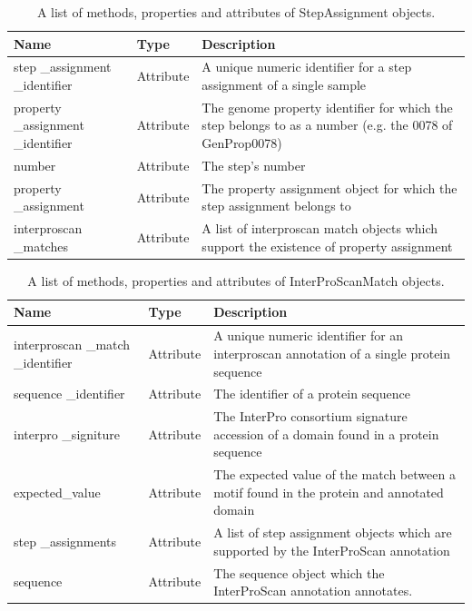 \begin{table}[!ht]
\centering
\caption{A list of methods, properties and attributes of StepAssignment objects.}
\label{tab:stepassignmentobject}
\begin{tabular}{|p{2.7cm}|p{2cm}|p{10cm}|}
\hline
\textbf{Name} & \textbf{Type} & \textbf{Description} \\ \hline
step \_assignment \_identifier & Attribute & A unique numeric identifier for a step assignment of a single sample \\ \hline
property \_assignment \_identifier & Attribute & The genome property identifier for which the step belongs to as a number (e.g. the 0078 of GenProp0078) \\ \hline
number & Attribute & The step's number \\ \hline
property \_assignment & Attribute & The property assignment object for which the step assignment belongs to \\ \hline
interproscan \_matches & Attribute & A list of interproscan match objects which support the existence of property assignment \\ \hline
\end{tabular}
\end{table}

\begin{table}[!ht]
\centering
\caption{A list of methods, properties and attributes of InterProScanMatch objects.}
\label{tab:interproscanannotationobject}
\begin{tabular}{|p{2.7cm}|p{2cm}|p{10cm}|}
\hline
\textbf{Name} & \textbf{Type} & \textbf{Description} \\ \hline
interproscan \_match \_identifier & Attribute & A unique numeric identifier for an interproscan annotation of a single protein sequence \\ \hline
sequence \_identifier & Attribute & The identifier of a protein sequence \\ \hline
interpro \_signiture & Attribute & The InterPro consortium signature accession of a domain found in a protein sequence \\ \hline
expected\_value & Attribute & The expected value of the match between a motif found in the protein and annotated domain \\ \hline
step \_assignments & Attribute & A list of step assignment objects which are supported by the InterProScan annotation \\ \hline
sequence & Attribute & The sequence object which the InterProScan annotation annotates. \\ \hline
\end{tabular}
\end{table}

